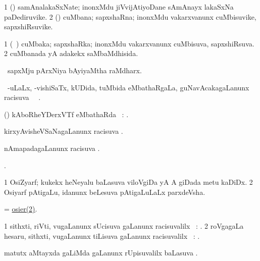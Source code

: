 \bentry
{}
\gl{\nA}
\bmng
\bnum
\num{1} (\jiVvi) samAnalakaSxNate; inonxMdu jiVvijAtiyoDane sAmAnayx lakaSxNa paDediruvike. 
\num{2} (\jAyx) cuMbana; sapxshaRna; inonxMdu vakarxvanunx cuMbisuvike, sapxshiRsuvike. 
\enum
\emng
\eentry

\bentry
{}
\gl{\gu}
\bmng
\bnum
\num{1} (\kanmu\ \jAyx) cuMbaka; sapxshaRka; inonxMdu vakarxvanunx cuMbisuva, sapxshiRsuva. 
\num{2} cuMbanada yA adakekx saMbaMdhisida. 
\enum
\emng
\eentry

\bentry
{}
\gl{\nA}
\bmng
\kanmu\ sapxMju pArxNiya bAyiyaMtha raMdharx. 
\emng
\eentry

\bentry
{}
\gl{\uparx}
\bmng
\kanmu\ -uLaLx, -vishiSaTx, kUDida, tuMbida eMbathaRgaLa, guNavAcakagaLanunx racisuva \uparx\ \udA\ . 
\emng
\eentry

\bentry
{}
\gl{\uparx}
\bmng
(\ravi) kAboRheYDerxVTf eMbathaRda \uparx\ : . 
\emng
\eentry

\bentry
{}
\gl{\uparx}
\bmng
kirxyAvisheVSaNagaLanunx racisuva \uparx. 
\emng
\eentry

\bentry
{}
\gl{\uparx}
\bmng
nAmapadagaLanunx racisuva \uparx. 
\emng
\eentry

\bentry
{}
\gl{\saMkiSx}
\bmng
{}. 
\emng
\eentry

\bentry
{}
\gl{\nA}
\bmng
\bnum
\num{1} OsiZyarf; kukekx heNeyalu baLasuva viloVgiDa yA A giDada metu kaDiDx. 
\hypertarget{osier(2)}{} 
\num{2} Osiyarf pAtigaLu, idanunx beLesuva pAtigaLuLaLx parxdeVsha. 
\enum
\emng
\eentry

\bentry
{}
\gl{\nA}
\bmng
= \hyperlink{osier(2)}{osier(2)}. 
\emng
\eentry

\bentry
{}
\gl{\uparx}
\bmng
\bnum
\num{1} sithxti, riVti, \mo vugaLanunx sUcisuva \nA gaLanunx racisuvalilx \parx\ : . 
\num{2} roVgagaLa hesaru, sithxti, \mo vugaLanunx tiLisuva \nA gaLanunx racisuvalilx \parx\ : . 
\enum
\emng
\eentry

\bentry
{}
\gl{\uparx}
\bmng
{} matutx  aMtayxda \gu gaLiMda \nA gaLanunx rUpisuvalilx baLasuva \uparx. 
\emng
\eentry

